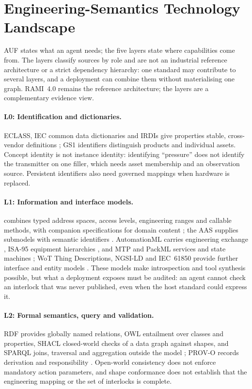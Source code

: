 \section{Engineering-Semantics Technology Landscape}
\label{sec:landscape}

AUF states what an agent needs; the five layers state where capabilities come from. The
layers classify sources by role and are not an industrial reference architecture or a
strict dependency hierarchy: one standard may contribute to several layers, and a
deployment can combine them without materialising one graph. RAMI~4.0 remains the
reference architecture; the layers are a complementary evidence view.

\paragraph{L0: Identification and dictionaries.} ECLASS, IEC common data dictionaries and
IRDIs give properties stable, cross-vendor definitions \cite{eclass,iec61360,iec61987,iso29002};
GS1 identifiers distinguish products and individual assets. Concept identity is not
instance identity: identifying ``pressure'' does not identify the transmitter on one filler,
which needs asset membership and an observation source. Persistent identifiers also need
governed mappings when hardware is replaced.

\paragraph{L1: Information and interface models.} \opcua{} combines typed address spaces,
access levels, engineering ranges and callable methods, with companion specifications for
domain content \cite{iec62541}; the AAS supplies submodels with semantic identifiers
\cite{idta2023aas,idta2023nameplate}. AutomationML carries engineering exchange
\cite{iec62714}, ISA-95 equipment hierarchies \cite{iec62264}, and MTP and PackML services
and state machines \cite{vdi2658,isa88}; WoT Thing Descriptions, NGSI-LD and IEC~61850
provide further interface and entity models \cite{w3c2023wot,etsi2023ngsild,iec61850}. These
models make introspection and tool synthesis possible, but what a deployment exposes must
be audited: an agent cannot check an interlock that was never published, even when the
host standard could express it.

\paragraph{L2: Formal semantics, query and validation.} RDF provides globally named
relations, OWL entailment over classes and properties, SHACL closed-world checks of a data
graph against shapes, and SPARQL joins, traversal and aggregation outside the model
\cite{w3c2014rdf,w3c2012owl,knublauch2017shacl,w3c2013sparql}; PROV-O records derivation
and responsibility \cite{w3c2013prov}. Open-world consistency does not enforce mandatory
action parameters, and shape conformance does not establish that the engineering mapping
or the set of interlocks is complete.

